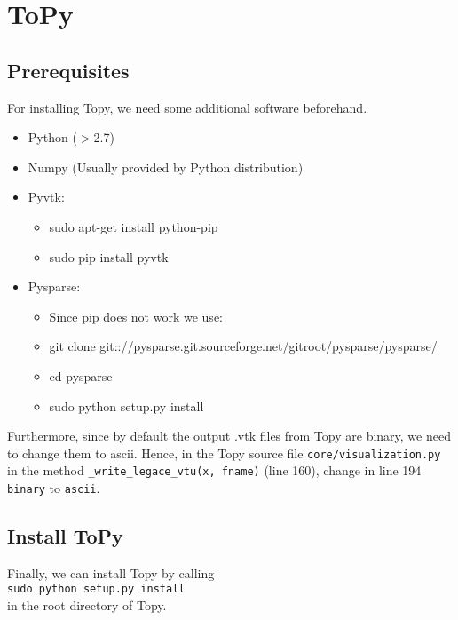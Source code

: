 \documentclass[11pt,a4paper,bibtotoc,idxtotoc,headsepline,footsepline,footexclude,DIV13,oneside]{scrbook}
\begin{document}
	\frontmatter
	
	
	
	
	
	
	
	
	\listoftodos
	\tableofcontents

	\mainmatter

	\chapter{ToPy}
	\section{Prerequisites}
	For installing Topy, we need some additional software beforehand.
	\begin{itemize}
	\item Python ($>$2.7)
	\item Numpy (Usually provided by Python distribution)
	\item Pyvtk:
		\begin{itemize}
		\item sudo apt-get install python-pip
		\item sudo pip install pyvtk
		\end{itemize}
	\item Pysparse:
		\begin{itemize}
		\item Since pip does not work we use:
		\item git clone git:://pysparse.git.sourceforge.net/gitroot/pysparse/pysparse/
		\item cd pysparse
		\item sudo python setup.py install		
		\end{itemize}
	\end{itemize}
	Furthermore, since by default the output .vtk files from Topy are binary, we need to change them to ascii. Hence, in the Topy source file \texttt{core/visualization.py} in the method \texttt{{\_}write{\_}legace{\_}vtu(x, fname)} (line 160), change in line 194 \texttt{binary} to \texttt{ascii}. 
	
	\section{Install ToPy}
	Finally, we can install Topy by calling \\
	\texttt{sudo python setup.py install} \\
	in the root directory of Topy.
\end{document}
